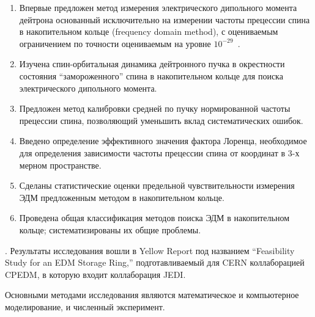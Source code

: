 {\novelty}
\begin{enumerate}
	\item Впервые предложен метод измерения электрического дипольного момента дейтрона основанный исключительно на измерении частоты прецессии спина в накопительном кольце (frequency domain method), с оцениваемым ограничением по точности оцениваемым на уровне $10^{-29}$~\ecm.
	\item Изучена спин-орбитальная динамика дейтронного пучка в окрестности состояния ``замороженного'' спина в накопительном кольце для поиска электрического дипольного момента. 
	\item Предложен метод калибровки средней по пучку нормированной частоты прецессии спина, позволяющий уменьшить вклад систематических ошибок.
	\item Введено определение эффективного значения фактора Лоренца, необходимое для определения зависимости частоты прецессии спина от координат в 3-х мерном пространстве. 
	\item Сделаны статистические оценки предельной чувствительности измерения ЭДМ предложенным методом в накопительном кольце. 
	\item Проведена общая классификация методов поиска ЭДМ в накопительном кольце; систематизированы их общие проблемы.
\end{enumerate}

{\influence}. Результаты исследования вошли в Yellow Report под названием ``Feasibility Study for an EDM Storage Ring,'' подготавливаемый для CERN коллаборацией CPEDM, в которую входит коллаборация JEDI.



{\methods} Основными методами исследования являются математическое и компьютерное моделирование, и численный эксперимент.


